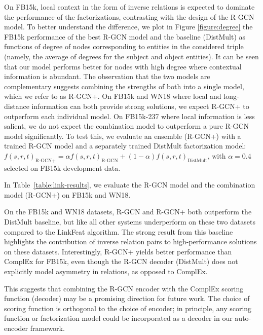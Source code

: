 \documentclass[letterpaper]{article} \usepackage{aaai18}  \usepackage{times}  \usepackage{helvet}  \usepackage{courier}  \usepackage{url}  \usepackage{graphicx}  \frenchspacing
\begin{document}
On FB15k, local context in the form of inverse relations is expected to dominate the performance of the factorizations, contrasting with the design of the R-GCN model. To better understand the difference, we plot in Figure \ref{figure:degree} the FB15k performance of the best R-GCN model and the baseline (DistMult) as functions of degree of nodes corresponding to entities in the considered triple
(namely, the average of degrees for the subject and object entities). It can be seen that our model performs better for nodes with high degree where contextual information is abundant. The observation that the two models are complementary suggests combining the strengths of both into a single model, which we refer to as R-GCN+. On FB15k and WN18 where local and long-distance information can both provide strong solutions, we expect R-GCN+ to outperform each individual model. On FB15k-237 where local information is less salient, we do not expect the combination model to outperform a pure R-GCN model significantly. To test this, we evaluate an ensemble (R-GCN+) with a trained R-GCN model and a separately trained DistMult factorization model: $f(s,r,t)_{\text{R-GCN+}} = \alpha f(s,r,t)_{\text{R-GCN}} + (1- \alpha) f(s,r,t)_{\text{DistMult}}$, with $\alpha=0.4$ selected on FB15k development data.

In Table~\ref{table:link-results}, we evaluate the R-GCN model and the combination model (R-GCN+) on FB15k and WN18.

On the FB15k and WN18 datasets, R-GCN and R-GCN+ both outperform the DistMult baseline, but like all other systems underperform on these two datasets compared to the LinkFeat algorithm. The strong result from this baseline highlights the contribution of inverse relation pairs to high-performance solutions on these datasets. Interestingly, R-GCN+ yields better performance than ComplEx for FB15k, even though the R-GCN decoder (DistMult) does not explicitly model asymmetry in relations, as opposed to ComplEx.

This suggests that combining the R-GCN encoder with the ComplEx scoring function (decoder) may be a promising direction for future work. The choice of scoring function is orthogonal to the choice of encoder; in principle, any scoring function or factorization model could be incorporated as a decoder in our auto-encoder framework.
\end{document}
